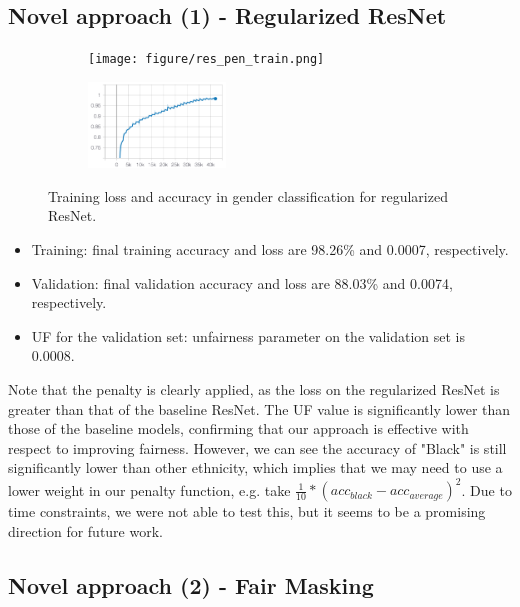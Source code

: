 \subsection{Novel approach (1) - Regularized ResNet}

\begin{figure}[H]
	\centering
	\begin{subfigure}
		\centering
		\texttt{[image: figure/res\_pen\_train.png]}
	\end{subfigure}
	\quad
	\begin{subfigure}
		\centering
		\includegraphics[width=0.4\textwidth]{figure/res_pen_acc.png}
	\end{subfigure}
	\caption{Training loss and accuracy in gender classification for regularized ResNet.}
	\label{fig: res pen}
\end{figure}

\begin{itemize}
\item Training: final training accuracy and loss are 98.26\% and 0.0007, respectively.

\item Validation: final validation accuracy and loss are 88.03\% and 0.0074, respectively.

\item UF for the validation set: unfairness parameter on the validation set is 0.0008.   
\end{itemize}

Note that the penalty is clearly applied, as the loss on the regularized ResNet is greater than that of the baseline ResNet. The UF value is significantly lower than those of the baseline models, confirming that our approach is effective with respect to improving fairness. However, we can see the accuracy of "Black" is still significantly lower than other ethnicity, which implies that we may need to use a lower weight in our penalty function, e.g. take $\frac{1}{10}*(acc_{black}-acc_{average})^2$. Due to time constraints, we were not able to test this, but it seems to be a promising direction for future work.

\subsection{Novel approach (2) - Fair Masking}


